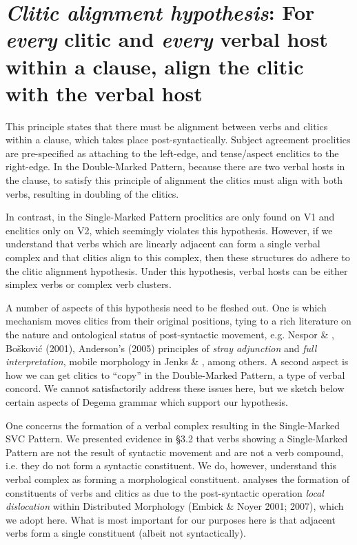 \documentclass[output=paper]{langsci/langscibook}
\begin{document}
\chapter[Clitic alignment hypothesis: For every clitic and every verbal host within a clause, align the clitic with the verbal host]{\textit{Clitic alignment hypothesis}\textbf{: }For \textit{every} clitic and \textit{every} verbal host within a clause, align the clitic with the verbal host}

This principle states that there must be alignment between verbs and clitics within a clause, which takes place post-syntactically. Subject agreement proclitics are pre-specified as attaching to the left-edge, and tense/aspect enclitics to the right-edge. In the Double-Marked Pattern, because there are two verbal hosts in the clause, to satisfy this principle of alignment the clitics must align with both verbs, resulting in doubling of the clitics. 

In contrast, in the Single-Marked Pattern proclitics are only found on V1 and enclitics only on V2, which seemingly violates this hypothesis. However, if we understand that verbs which are linearly adjacent can form a single verbal complex and that clitics align to this complex, then these structures do adhere to the clitic alignment hypothesis. Under this hypothesis, verbal hosts can be either simplex verbs or complex verb clusters.

  A number of aspects of this hypothesis need to be fleshed out. One is which mechanism moves clitics from their original positions, tying to a rich literature on the nature and ontological status of post-syntactic movement, e.g. Nespor \& \citet{Vogel1986}, Bošković (2001), Anderson’s (2005) principles of \textit{stray adjunction }and\textit{ full interpretation}, mobile morphology in Jenks \& \citet{Rose2015}, among others. A second aspect is how we can get clitics to “copy” in the Double-Marked Pattern, a type of verbal concord. We cannot satisfactorily address these issues here, but we sketch below certain aspects of Degema grammar which support our hypothesis. 

One concerns the formation of a verbal complex resulting in the Single-Marked SVC Pattern. We presented evidence in §3.2 that verbs showing a Single-Marked Pattern are not the result of syntactic movement and are not a verb compound, i.e. they do not form a syntactic constituent. We do, however, understand this verbal complex as forming a morphological constituent. \citet{Rolle2015} analyses the formation of constituents of verbs and clitics as due to the post-syntactic operation \textit{local dislocation }within Distributed Morphology (Embick \& Noyer 2001; 2007), which we adopt here. What is most important for our purposes here is that adjacent verbs form a single constituent (albeit not syntactically). 
\end{document}
